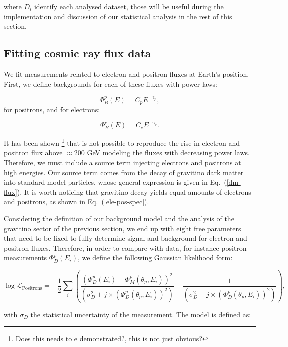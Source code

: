 \documentclass[a4paper,11pt]{article}
\begin{document}
\noindent where $D_i$ identify each analysed dataset, those will be useful during the implementation and discussion of our statistical analysis in the rest of this section.

\subsection{Fitting cosmic ray flux data}

We fit measurements related to electron and positron fluxes at Earth's position. First, we define backgrounds for each of these fluxes with power laws:

\begin{equation}
\Phi_B^p(E) = C_p E^{-\gamma_p}, 
\end{equation}
for positrons, and for electrons:

\begin{equation}
\Phi_B^e(E) = C_e E^{-\gamma_e}.
\end{equation}

It has been shown \cite{ref}\footnote{Does this needs to e demonstrated?, this is not just obvious?} that is not possible to reproduce the rise in electron and positron flux above $\approx 200$ GeV modeling the fluxes with decreasing power laws. Therefore, we must include a source term injecting electrons and positrons at high energies. Our source term comes from the decay of gravitino dark matter into standard model particles, whose general expression is given in Eq.~(\ref{dm-flux}). It is worth noticing that gravitino decay yields equal amounts of electrons and positrons, as shown in Eq.~(\ref{ele-pos-spec}). 

Considering the definition of our background model and the analysis of the gravitino sector of the previous section, we end up with eight free parameters that need to be fixed to fully determine signal and background for electron and positron fluxes. Therefore, in order to compare with data, for instance positron measurements $\Phi_D^p(E_i)$, we define the following Gaussian likelihood form:

\begin{equation}
\log  \mathcal{L}_{\text{Positrons}} = -\frac{1}{2} \sum_i{\left( \frac{(\Phi_D^p(E_i) - \Phi_M^p(\theta_p,E_i ))^2}{(\sigma_D^2 + j\times (\Phi_D^{p}(\theta_p,E_i))^2)} - \frac{1}{(\sigma_D^2 + j\times (\Phi_D^{p}(\theta_p,E_i))^2)}  \right) },
\end{equation}

\noindent with $\sigma_D$ the statistical uncertainty of the measurement. The model is defined as:
\end{document}
